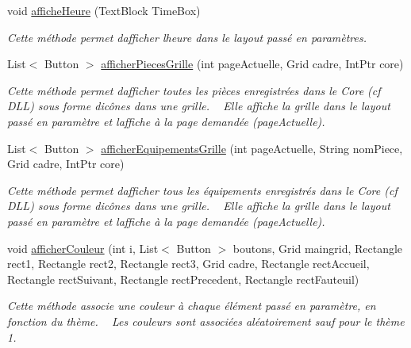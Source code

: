 \begin{DoxyCompactItemize}
void \hyperlink{class_my_domotik_1_1_affichage_a1b41c3092451423dce76c336c1036b11}{affiche\+Heure} (Text\+Block Time\+Box)
\begin{DoxyCompactList}\small\item\em Cette méthode permet d\textquotesingle{}afficher l\textquotesingle{}heure dans le layout passé en paramètres. \end{DoxyCompactList}\item 
List$<$ Button $>$ \hyperlink{class_my_domotik_1_1_affichage_a3c73ff2b9b5837148829425f0da0297a}{afficher\+Pieces\+Grille} (int page\+Actuelle, Grid cadre, Int\+Ptr core)
\begin{DoxyCompactList}\small\item\em Cette méthode permet d\textquotesingle{}afficher toutes les pièces enregistrées dans le Core (cf D\+LL) sous forme d\textquotesingle{}icônes dans une grille. ~\newline
Elle affiche la grille dans le layout passé en paramètre et l\textquotesingle{}affiche à la page demandée (page\+Actuelle). \end{DoxyCompactList}\item 
List$<$ Button $>$ \hyperlink{class_my_domotik_1_1_affichage_af33a1fbcfc31912bbdb419214d41f04e}{afficher\+Equipements\+Grille} (int page\+Actuelle, String nom\+Piece, Grid cadre, Int\+Ptr core)
\begin{DoxyCompactList}\small\item\em Cette méthode permet d\textquotesingle{}afficher tous les équipements enregistrés dans le Core (cf D\+LL) sous forme d\textquotesingle{}icônes dans une grille. ~\newline
Elle affiche la grille dans le layout passé en paramètre et l\textquotesingle{}affiche à la page demandée (page\+Actuelle). \end{DoxyCompactList}\item 
void \hyperlink{class_my_domotik_1_1_affichage_a80ececacfa28945d11e443bd699c86b1}{afficher\+Couleur} (int i, List$<$ Button $>$ boutons, Grid maingrid, Rectangle rect1, Rectangle rect2, Rectangle rect3, Grid cadre, Rectangle rect\+Accueil, Rectangle rect\+Suivant, Rectangle rect\+Precedent, Rectangle rect\+Fauteuil)
\begin{DoxyCompactList}\small\item\em Cette méthode associe une couleur à chaque élément passé en paramètre, en fonction du thème. ~\newline
Les couleurs sont associées aléatoirement sauf pour le thème 1. \end{DoxyCompactList}\end{DoxyCompactItemize}


